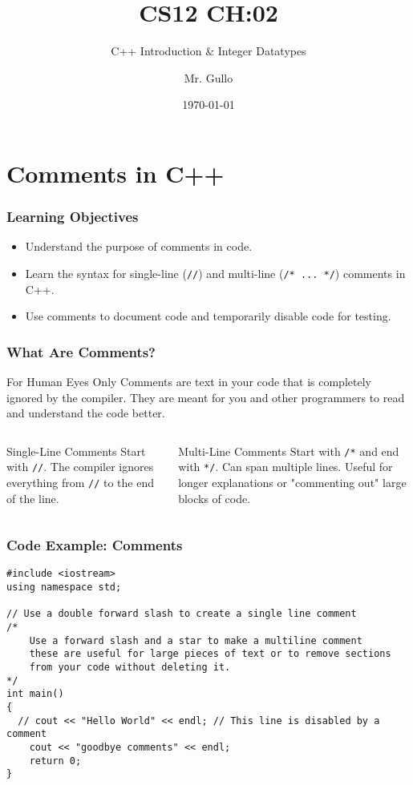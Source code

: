 \documentclass{beamer}
\title[Integer Datatypes]{CS12 CH:02}
\subtitle{C++ Introduction \& Integer Datatypes}
\author[Mr. Gullo]{Mr. Gullo}
\date[\today]{\today}
\begin{document}
\frame{\titlepage}

\section{Comments in C++}

\begin{frame}
\frametitle{Learning Objectives}
\begin{itemize}
    \item Understand the purpose of comments in code.
    \item Learn the syntax for single-line (\texttt{//}) and multi-line (\texttt{/* ... */}) comments in C++.
    \item Use comments to document code and temporarily disable code for testing.
\end{itemize}
\end{frame}

\begin{frame}
\frametitle{What Are Comments?}
\begin{block}{For Human Eyes Only}
Comments are text in your code that is completely ignored by the compiler. They are meant for you and other programmers to read and understand the code better.
\end{block}

\begin{columns}[T]
    \begin{column}{0.5\textwidth}
        \begin{alertblock}{Single-Line Comments}
        Start with \texttt{//}. The compiler ignores everything from \texttt{//} to the end of the line.
        \end{alertblock}
    \end{column}
    \begin{column}{0.5\textwidth}
        \begin{exampleblock}{Multi-Line Comments}
        Start with \texttt{/*} and end with \texttt{*/}. Can span multiple lines. Useful for longer explanations or "commenting out" large blocks of code.
        \end{exampleblock}
    \end{column}
\end{columns}
\end{frame}

\begin{frame}[fragile]
\frametitle{Code Example: Comments}
\begin{verbatim}
#include <iostream>
using namespace std;

// Use a double forward slash to create a single line comment
/*
    Use a forward slash and a star to make a multiline comment
    these are useful for large pieces of text or to remove sections
    from your code without deleting it.
*/
int main()
{
  // cout << "Hello World" << endl; // This line is disabled by a comment
    cout << "goodbye comments" << endl;
    return 0;
}
\end{verbatim}
\end{frame}
\end{document}
